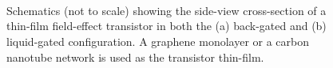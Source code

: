 \documentclass[
  a4paper,
]{scrbook}
\begin{document}
\begin{figure}
\begin{minipage}[t]{0.01\linewidth}
{\centering 

~

}

\end{minipage}%
%
\begin{minipage}[t]{0.03\linewidth}

{\centering 


}

\end{minipage}%
%
\begin{minipage}[t]{0.01\linewidth}

{\centering 

~

}

\end{minipage}%
%
\begin{minipage}[t]{0.45\linewidth}

{\centering 


}

\end{minipage}%
%
\begin{minipage}[t]{0.01\linewidth}

{\centering 

~

}

\end{minipage}%

\caption{\label{fig-gating-schematics}Schematics (not to scale) showing
the side-view cross-section of a thin-film field-effect transistor in
both the (a) back-gated and (b) liquid-gated configuration. A graphene
monolayer or a carbon nanotube network is used as the transistor
thin-film.}

\end{figure}
\end{document}
